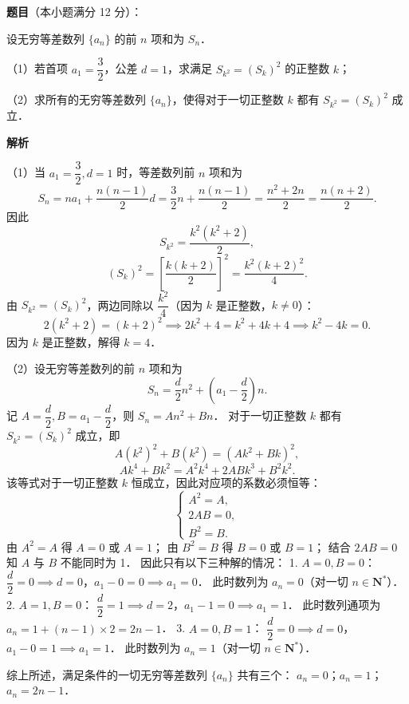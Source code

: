 \begin{answer}

\textbf{题目}（本小题满分 12 分）：

设无穷等差数列 $\{a_n\}$ 的前 $n$ 项和为 $S_n$．

（1）若首项 $a_1 = \dfrac{3}{2}$，公差 $d = 1$，求满足 $S_{k^2} = (S_k)^2$ 的正整数 $k$；

（2）求所有的无穷等差数列 $\{a_n\}$，使得对于一切正整数 $k$ 都有 $S_{k^2} = (S_k)^2$ 成立．

\textbf{解析}

（1）当 $a_1 = \dfrac{3}{2}, d = 1$ 时，等差数列前 $n$ 项和为
\nopagebreak[4]
\[
S_n = n a_1 + \frac{n(n - 1)}{2} d = \frac{3}{2}n + \frac{n(n - 1)}{2} = \frac{n^2 + 2n}{2} = \frac{n(n + 2)}{2}.
\]
因此
\nopagebreak[4]
\[
S_{k^2} = \frac{k^2(k^2 + 2)}{2},
\]
\nopagebreak[4]
\[
(S_k)^2 = \left[\frac{k(k + 2)}{2}\right]^2 = \frac{k^2(k + 2)^2}{4}.
\]
由 $S_{k^2} = (S_k)^2$，两边同除以 $\dfrac{k^2}{4}$（因为 $k$ 是正整数，$k \neq 0$）：
\nopagebreak[4]
\[
2(k^2 + 2) = (k + 2)^2 \implies 2k^2 + 4 = k^2 + 4k + 4 \implies k^2 - 4k = 0.
\]
因为 $k$ 是正整数，解得 $k = 4$．

（2）设无穷等差数列的前 $n$ 项和为
\nopagebreak[4]
\[
S_n = \frac{d}{2}n^2 + \left(a_1 - \frac{d}{2}\right)n.
\]
记 $A = \dfrac{d}{2}, B = a_1 - \dfrac{d}{2}$，则 $S_n = A n^2 + B n$．
对于一切正整数 $k$ 都有 $S_{k^2} = (S_k)^2$ 成立，即
\nopagebreak[4]
\[
A(k^2)^2 + B(k^2) = (A k^2 + B k)^2,
\]
\nopagebreak[4]
\[
A k^4 + B k^2 = A^2 k^4 + 2AB k^3 + B^2 k^2.
\]
该等式对于一切正整数 $k$ 恒成立，因此对应项的系数必须恒等：
\nopagebreak[4]
\[
\begin{cases}
A^2 = A, \\
2AB = 0, \\
B^2 = B.
\end{cases}
\]
由 $A^2 = A$ 得 $A = 0$ 或 $A = 1$；
由 $B^2 = B$ 得 $B = 0$ 或 $B = 1$；
结合 $2AB = 0$ 知 $A$ 与 $B$ 不能同时为 1．
因此只有以下三种解的情况：
1. $A = 0, B = 0$：
   $\dfrac{d}{2} = 0 \implies d = 0$，$a_1 - 0 = 0 \implies a_1 = 0$．
   此时数列为 $a_n = 0$（对一切 $n \in \mathbf{N}^*$）．
2. $A = 1, B = 0$：
   $\dfrac{d}{2} = 1 \implies d = 2$，$a_1 - 1 = 0 \implies a_1 = 1$．
   此时数列通项为 $a_n = 1 + (n - 1) \times 2 = 2n - 1$．
3. $A = 0, B = 1$：
   $\dfrac{d}{2} = 0 \implies d = 0$，$a_1 - 0 = 1 \implies a_1 = 1$．
   此时数列为 $a_n = 1$（对一切 $n \in \mathbf{N}^*$）．

综上所述，满足条件的一切无穷等差数列 $\{a_n\}$ 共有三个：
$a_n = 0$；$a_n = 1$；$a_n = 2n - 1$．


\end{answer}
